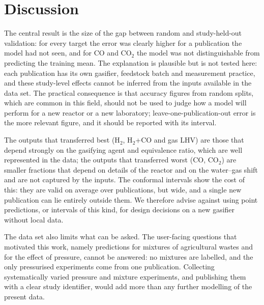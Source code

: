 \documentclass[11pt,a4paper]{article}
\begin{document}
\section{Discussion}
The central result is the size of the gap between random and study-held-out validation: for every target the error was clearly higher for a publication the model had not seen, and for CO and CO$_2$ the model was not distinguishable from predicting the training mean. The explanation is plausible but is not tested here: each publication has its own gasifier, feedstock batch and measurement practice, and these study-level effects cannot be inferred from the inputs available in the data set. The practical consequence is that accuracy figures from random splits, which are common in this field, should not be used to judge how a model will perform for a new reactor or a new laboratory; leave-one-publication-out error is the more relevant figure, and it should be reported with its interval.

The outputs that transferred best (H$_2$, H$_2$+CO and gas LHV) are those that depend strongly on the gasifying agent and equivalence ratio, which are well represented in the data; the outputs that transferred worst (CO, CO$_2$) are smaller fractions that depend on details of the reactor and on the water--gas shift and are not captured by the inputs. The conformal intervals show the cost of this: they are valid on average over publications, but wide, and a single new publication can lie entirely outside them. We therefore advise against using point predictions, or intervals of this kind, for design decisions on a new gasifier without local data.

The data set also limits what can be asked. The user-facing questions that motivated this work, namely predictions for mixtures of agricultural wastes and for the effect of pressure, cannot be answered: no mixtures are labelled, and the only pressurised experiments come from one publication. Collecting systematically varied pressure and mixture experiments, and publishing them with a clear study identifier, would add more than any further modelling of the present data.
\end{document}
